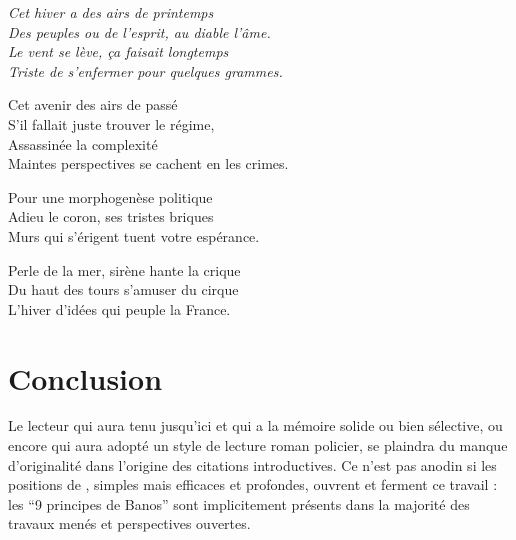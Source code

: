 




\raggedleft
\textit{
Cet hiver a des airs de printemps\\
Des peuples ou de l'esprit, au diable l'âme.\\
Le vent se lève, ça faisait longtemps\\
Triste de s'enfermer pour quelques grammes.\\
}

\medskip

\raggedright

Cet avenir des airs de passé\\
S'il fallait juste trouver le régime,\\
Assassinée la complexité\\
Maintes perspectives se cachent en les crimes.\\

\medskip
\raggedleft

Pour une morphogenèse politique\\
Adieu le coron, ses tristes briques\\
Murs qui s'érigent tuent votre espérance.\\

\medskip
\raggedright

Perle de la mer, sirène hante la crique\\
Du haut des tours s'amuser du cirque\\
L'hiver d'idées qui peuple la France.\\






\newpage






\chapter{Conclusion}







Le lecteur qui aura tenu jusqu'ici et qui a la mémoire solide ou bien sélective, ou encore qui aura adopté un style de lecture roman policier, se plaindra du manque d'originalité dans l'origine des citations introductives. Ce n'est pas anodin si les positions de , simples mais efficaces et profondes, ouvrent et ferment ce travail : les ``9 principes de Banos'' sont implicitement présents dans la majorité des travaux menés et perspectives ouvertes. 











